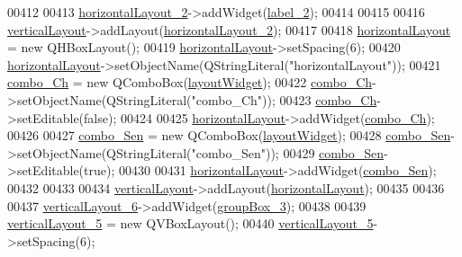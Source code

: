 \begin{DoxyCode}
00412 
00413         \hyperlink{a00080_a80867018070156432923d0266cc9fe25}{horizontalLayout\_2}->addWidget(\hyperlink{a00080_a2e2516d755e4dd53fc905dabddf2738a}{label\_2});
00414 
00415 
00416         \hyperlink{a00080_aecd96a04789fcfec3f98d80390ad8184}{verticalLayout}->addLayout(\hyperlink{a00080_a80867018070156432923d0266cc9fe25}{horizontalLayout\_2});
00417 
00418         \hyperlink{a00080_acd6fdc9ebacc4b25b834162380d75ce8}{horizontalLayout} = \textcolor{keyword}{new} QHBoxLayout();
00419         \hyperlink{a00080_acd6fdc9ebacc4b25b834162380d75ce8}{horizontalLayout}->setSpacing(6);
00420         \hyperlink{a00080_acd6fdc9ebacc4b25b834162380d75ce8}{horizontalLayout}->setObjectName(QStringLiteral(\textcolor{stringliteral}{"horizontalLayout"}));
00421         \hyperlink{a00080_a263fb43f2eff37a44ff7359ba41e2eeb}{combo\_Ch} = \textcolor{keyword}{new} QComboBox(\hyperlink{a00080_ab96ab0f0578098521fa69a75aa5cdde8}{layoutWidget});
00422         \hyperlink{a00080_a263fb43f2eff37a44ff7359ba41e2eeb}{combo\_Ch}->setObjectName(QStringLiteral(\textcolor{stringliteral}{"combo\_Ch"}));
00423         \hyperlink{a00080_a263fb43f2eff37a44ff7359ba41e2eeb}{combo\_Ch}->setEditable(\textcolor{keyword}{false});
00424 
00425         \hyperlink{a00080_acd6fdc9ebacc4b25b834162380d75ce8}{horizontalLayout}->addWidget(\hyperlink{a00080_a263fb43f2eff37a44ff7359ba41e2eeb}{combo\_Ch});
00426 
00427         \hyperlink{a00080_ad95005b5fcac8126171019298147b285}{combo\_Sen} = \textcolor{keyword}{new} QComboBox(\hyperlink{a00080_ab96ab0f0578098521fa69a75aa5cdde8}{layoutWidget});
00428         \hyperlink{a00080_ad95005b5fcac8126171019298147b285}{combo\_Sen}->setObjectName(QStringLiteral(\textcolor{stringliteral}{"combo\_Sen"}));
00429         \hyperlink{a00080_ad95005b5fcac8126171019298147b285}{combo\_Sen}->setEditable(\textcolor{keyword}{true});
00430 
00431         \hyperlink{a00080_acd6fdc9ebacc4b25b834162380d75ce8}{horizontalLayout}->addWidget(\hyperlink{a00080_ad95005b5fcac8126171019298147b285}{combo\_Sen});
00432 
00433 
00434         \hyperlink{a00080_aecd96a04789fcfec3f98d80390ad8184}{verticalLayout}->addLayout(\hyperlink{a00080_acd6fdc9ebacc4b25b834162380d75ce8}{horizontalLayout});
00435 
00436 
00437         \hyperlink{a00080_a93c190b085c63a667c535ba0bbcfec7c}{verticalLayout\_6}->addWidget(\hyperlink{a00080_a320d3d7ba1cb8fff7b7b95923ed10f5e}{groupBox\_3});
00438 
00439         \hyperlink{a00080_afcc20a3d5058037a00cdc6122f231848}{verticalLayout\_5} = \textcolor{keyword}{new} QVBoxLayout();
00440         \hyperlink{a00080_afcc20a3d5058037a00cdc6122f231848}{verticalLayout\_5}->setSpacing(6);

\end{DoxyCode}
